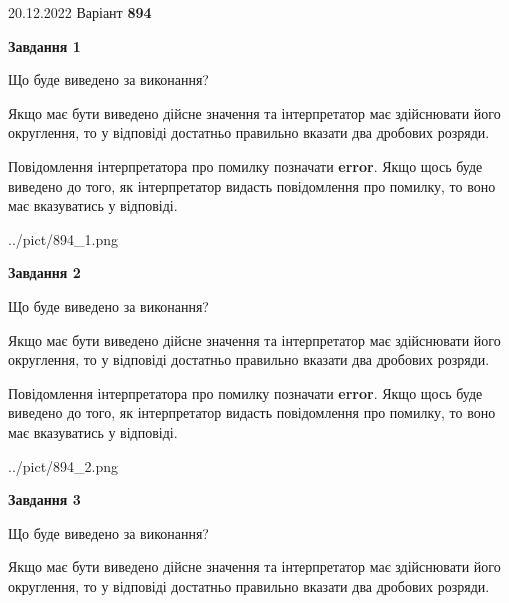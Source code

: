 \documentclass[12pt, ukrainian]{article}
\begin{document}
{20.12.2022 Варіант \No \textbf { 894 }\par}
{
\begin {Large}

{\begin {center}\textbf{Завдання 1}\end {center}}\par
Що буде виведено за виконання? \par

Якщо має бути виведено дійсне значення та інтерпретатор має здійснювати його округлення, 
то у відповіді достатньо правильно вказати два дробових розряди.

Повідомлення інтерпретатора про помилку позначати \textbf{error}.
Якщо щось буде виведено до того, як інтерпретатор видасть повідомлення про помилку, 
то воно має вказуватись у відповіді. \par

\begin{center}
	{../pict/894_1.png}
\end{center}
\newpage

{\begin {center}\textbf{Завдання 2}\end {center}}\par
Що буде виведено за виконання? \par

Якщо має бути виведено дійсне значення та інтерпретатор має здійснювати його округлення, 
то у відповіді достатньо правильно вказати два дробових розряди.

Повідомлення інтерпретатора про помилку позначати \textbf{error}.
Якщо щось буде виведено до того, як інтерпретатор видасть повідомлення про помилку, 
то воно має вказуватись у відповіді. \par

\begin{center}
	{../pict/894_2.png}
\end{center}
\newpage

{\begin {center}\textbf{Завдання 3}\end {center}}\par
Що буде виведено за виконання? \par

Якщо має бути виведено дійсне значення та інтерпретатор має здійснювати його округлення, 
то у відповіді достатньо правильно вказати два дробових розряди.


\end{Large}}
\end{document}
